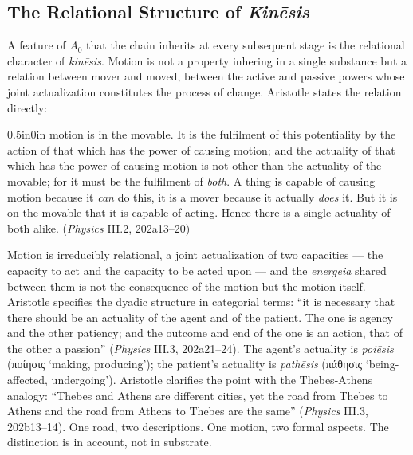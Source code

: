 \documentclass{article}
\newcommand{\gk}[1]{{\greekfont #1}}
\begin{document}
\subsection{The Relational Structure of \textit{Kinēsis}}

A feature of $A_0$ that the chain inherits at every subsequent stage is the relational character of \textit{kinēsis}. Motion is not a property inhering in a single substance but a relation between mover and moved, between the active and passive powers whose joint actualization constitutes the process of change. Aristotle states the relation directly:
\begin{adjustwidth}{0.5in}{0in}
motion is in the movable. It is the fulfilment of this potentiality by the action of that which has the power of causing motion; and the actuality of that which has the power of causing motion is not other than the actuality of the movable; for it must be the fulfilment of \textit{both}. A thing is capable of causing motion because it \textit{can} do this, it is a mover because it actually \textit{does} it. But it is on the movable that it is capable of acting. Hence there is a single actuality of both alike. (\textit{Physics} III.2, 202a13--20)
\end{adjustwidth}
Motion is irreducibly relational, a joint actualization of two capacities --- the capacity to act and the capacity to be acted upon --- and the \textit{energeia} shared between them is not the consequence of the motion but the motion itself. Aristotle specifies the dyadic structure in categorial terms: ``it is necessary that there should be an actuality of the agent and of the patient. The one is agency and the other patiency; and the outcome and end of the one is an action, that of the other a passion'' (\textit{Physics} III.3, 202a21--24). The agent's actuality is \textit{poiēsis} (\gk{ποίησις} `making, producing'); the patient's actuality is \textit{pathēsis} (\gk{πάθησις} `being-affected, undergoing'). Aristotle clarifies the point with the Thebes-Athens analogy: ``Thebes and Athens are different cities, yet the road from Thebes to Athens and the road from Athens to Thebes are the same'' (\textit{Physics} III.3, 202b13--14). One road, two descriptions. One motion, two formal aspects. The distinction is in account, not in substrate.
\end{document}
